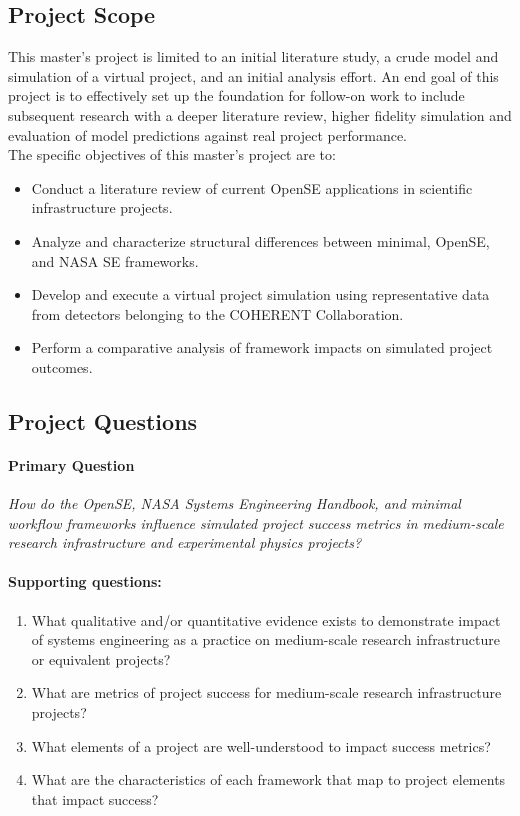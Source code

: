 \subsection{Project Scope}
\label{sub:scope}
This master’s project is limited to an initial literature study, a crude model and simulation of a virtual project, and an initial analysis effort. 
An end goal of this project is to effectively set up the foundation for follow-on work to include subsequent research with a deeper literature review, higher fidelity simulation and evaluation of model predictions against real project performance.\\
The specific objectives of this master’s project are to:
\begin{itemize}
    \item Conduct a literature review of current OpenSE applications in scientific infrastructure projects.
    \item Analyze and characterize structural differences between minimal, OpenSE, and NASA SE frameworks.
    \item Develop and execute a virtual project simulation using representative data from detectors belonging to the COHERENT Collaboration.
    \item Perform a comparative analysis of framework impacts on simulated project outcomes.
\end{itemize}
\subsection{Project Questions}
\label{sub:primaryQuestion}
\paragraph{Primary Question}
\begin{center}
\textit{How do the OpenSE, NASA Systems Engineering Handbook, and minimal workflow frameworks influence simulated project success metrics in medium-scale research infrastructure and experimental physics projects?}
\end{center}
\paragraph{Supporting questions:}
\begin{enumerate}
    \item What qualitative and/or quantitative evidence exists to demonstrate impact of systems engineering as a practice on medium-scale research infrastructure or equivalent projects?
    \item What are metrics of project success for medium-scale research infrastructure projects?
    \item What elements of a project are well-understood to impact success metrics?
    \item What are the characteristics of each framework that map to project elements that impact success?
\end{enumerate}